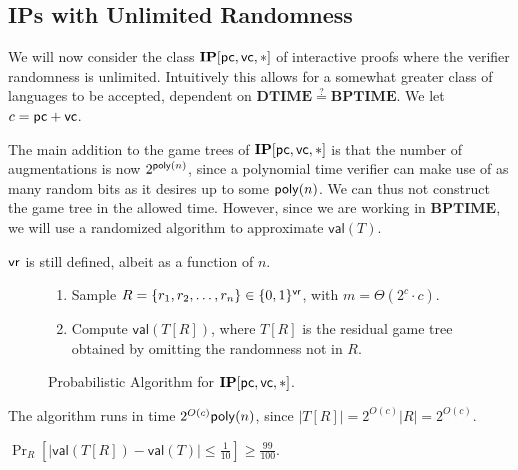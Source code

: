 \subsection{IPs with Unlimited Randomness}

We will now consider the class $\mathbf{IP}[\mathsf{pc}, \mathsf{vc}, *]$ of interactive proofs where the verifier randomness is unlimited. Intuitively this allows for a somewhat greater class of languages to be accepted, dependent on $\mathbf{DTIME}\stackrel{?}{=}\mathbf{BPTIME}$. We let $c=\mathsf{pc}+\mathsf{vc}$.

The main addition to the game trees of $\mathbf{IP}[\mathsf{pc}, \mathsf{vc}, *]$ is that the number of augmentations is now $2^{\mathsf{poly}(n)}$, since a polynomial time verifier can make use of as many random bits as it desires up to some $\mathsf{poly}(n)$. We can thus not construct the game tree in the allowed time. However, since we are working in $\mathbf{BPTIME}$, we will use a randomized algorithm to approximate $\mathsf{val}(T)$.

$\mathsf{vr}$ is still defined, albeit as a function of $n$.

\begin{figure}[h]
 	\begin{mdframed}[
 		linecolor=black,
 		linewidth=1pt,
 		roundcorner=5pt,
 		backgroundcolor=white,
 		userdefinedwidth=\textwidth,
 		]
 		\vspace{2mm}
 		\begin{enumerate}
 			\item Sample $R=\{r_1,r_2,\dots, r_n\}\in\{0,1\}^{\mathsf{vr}}$, with $m=\Theta(2^c\cdot c)$.\vspace{1mm}
 			\item Compute $\mathsf{val}(T[R])$, where $T[R]$ is the residual game tree obtained by omitting the randomness not in $R$.
 		\end{enumerate}
 		\vspace{2mm}
 	\end{mdframed}
 	\caption{Probabilistic Algorithm for $\mathbf{IP}[\mathsf{pc},\mathsf{vc},*]$.}
 	\label{fig:ippcvc*}
\end{figure}

The algorithm runs in time $2^{O(c)}\mathsf{poly}(n)$, since $|T[R]|=2^{O(c)}|R|=2^{O(c)}$.
 
\begin{lemma}
	$\Pr_R\left[|\mathsf{val}(T[R])-\mathsf{val}(T)|\leq\frac{1}{10}\right]\geq \frac{99}{100}$.
\end{lemma}

